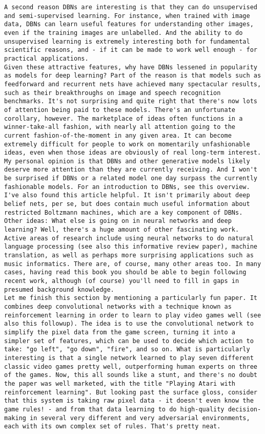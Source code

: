 \begin{lstlisting}
A second reason DBNs are interesting is that they can do unsupervised and semi-supervised learning. For instance, when trained with image data, DBNs can learn useful features for understanding other images, even if the training images are unlabelled. And the ability to do unsupervised learning is extremely interesting both for fundamental scientific reasons, and - if it can be made to work well enough - for practical applications.
Given these attractive features, why have DBNs lessened in popularity as models for deep learning? Part of the reason is that models such as feedforward and recurrent nets have achieved many spectacular results, such as their breakthroughs on image and speech recognition benchmarks. It's not surprising and quite right that there's now lots of attention being paid to these models. There's an unfortunate corollary, however. The marketplace of ideas often functions in a winner-take-all fashion, with nearly all attention going to the current fashion-of-the-moment in any given area. It can become extremely difficult for people to work on momentarily unfashionable ideas, even when those ideas are obviously of real long-term interest. My personal opinion is that DBNs and other generative models likely deserve more attention than they are currently receiving. And I won't be surprised if DBNs or a related model one day surpass the currently fashionable models. For an introduction to DBNs, see this overview. I've also found this article helpful. It isn't primarily about deep belief nets, per se, but does contain much useful information about restricted Boltzmann machines, which are a key component of DBNs.
Other ideas: What else is going on in neural networks and deep learning? Well, there's a huge amount of other fascinating work. Active areas of research include using neural networks to do natural language processing (see also this informative review paper), machine translation, as well as perhaps more surprising applications such as music informatics. There are, of course, many other areas too. In many cases, having read this book you should be able to begin following recent work, although (of course) you'll need to fill in gaps in presumed background knowledge.
Let me finish this section by mentioning a particularly fun paper. It combines deep convolutional networks with a technique known as reinforcement learning in order to learn to play video games well (see also this followup). The idea is to use the convolutional network to simplify the pixel data from the game screen, turning it into a simpler set of features, which can be used to decide which action to take: "go left", "go down", "fire", and so on. What is particularly interesting is that a single network learned to play seven different classic video games pretty well, outperforming human experts on three of the games. Now, this all sounds like a stunt, and there's no doubt the paper was well marketed, with the title "Playing Atari with reinforcement learning". But looking past the surface gloss, consider that this system is taking raw pixel data - it doesn't even know the game rules! - and from that data learning to do high-quality decision-making in several very different and very adversarial environments, each with its own complex set of rules. That's pretty neat.

\end{lstlisting}
